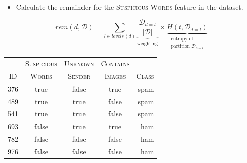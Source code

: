 \documentclass[xcolor={table}]{beamer}
\newcommand{\featN}[1]{\textsc{#1}}
\begin{document}
\begin{frame}
	\begin{itemize}
		\item Calculate the \alert{remainder} for the \featN{Suspicious Words} feature in the dataset.
	\end{itemize}
\begin{equation*}
rem\left(d,\mathcal{D}\right) = 
\sum_{l \in levels\left(d\right)} 
\underbrace{
\frac{|\mathcal{D}_{d=l}|}{|\mathcal{D}|}}_{\text{weighting}} \times
 \underbrace{H\left(t, \mathcal{D}_{d=l}\right)}_{
	\substack{
		\text{entropy of}\\
		\text{partition }\mathcal{D}_{d=l}
	}
}
\end{equation*}
	\begin{table}[!hbt]
\centering
\begin{footnotesize}
\begin{tabular}{ccccr}
\hline
	 & \featN{Suspicious}	& \featN{Unknown}	 & \featN{Contains}	 & \featN{} \\
\featN{ID}	 & \featN{Words}	& \featN{Sender}	 & \featN{Images}	 & \featN{Class} \\
\hline
376	 & true	 & false 	 & true	& spam \\
489	 & true	 & true 	 & false	& spam \\
541	 & true	 & true 	 & false	& spam \\
693	 & false	 & true 	 & true	& ham \\
782	 & false	 & false 	 & false	& ham \\
976	 & false	 & false 	 & false	& ham \\
\hline
\end{tabular}
\end{footnotesize}
\end{table}
\end{frame}
\end{document}
